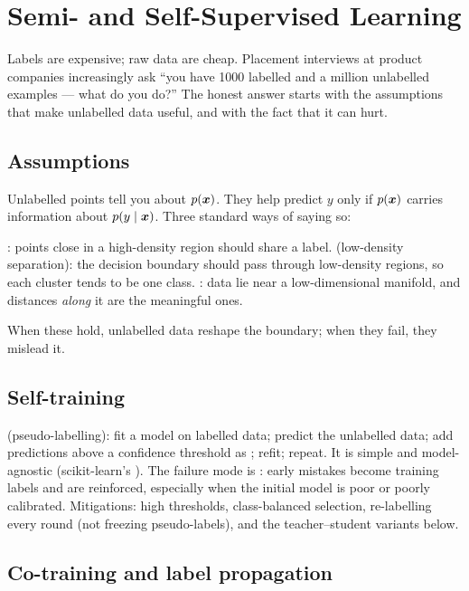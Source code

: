 \chapter{Semi- and Self-Supervised Learning}
\label{ch:semisup}
Labels are expensive; raw data are cheap. Placement interviews at product companies increasingly ask
``you have 1000 labelled and a million unlabelled examples --- what do you do?'' The honest answer
starts with the assumptions that make unlabelled data useful, and with the fact that it can hurt.

\section{Assumptions}
Unlabelled points tell you about $p({\bm{x}})$. They help predict $y$ only if $p({\bm{x}})$ carries information about
$p(y\mid{\bm{x}})$. Three standard ways of saying so:
\begin{itemize}
	\ii {}: points close in a high-density region should share a label.
	\ii {} (low-density separation): the decision boundary should pass through low-density
	regions, so each cluster tends to be one class.
	\ii {}: data lie near a low-dimensional manifold, and distances \emph{along} it are the
	meaningful ones.
\end{itemize}
When these hold, unlabelled data reshape the boundary; when they fail, they mislead it.

\section{Self-training}
 (pseudo-labelling): fit a model on labelled data; predict the unlabelled data; add
predictions above a confidence threshold as ; refit; repeat. It is simple and
model-agnostic (scikit-learn's ). The failure mode is
: early mistakes become training labels and are reinforced, especially when the
initial model is poor or poorly calibrated. Mitigations: high thresholds, class-balanced selection,
re-labelling every round (not freezing pseudo-labels), and the teacher--student variants below.

\section{Co-training and label propagation}

